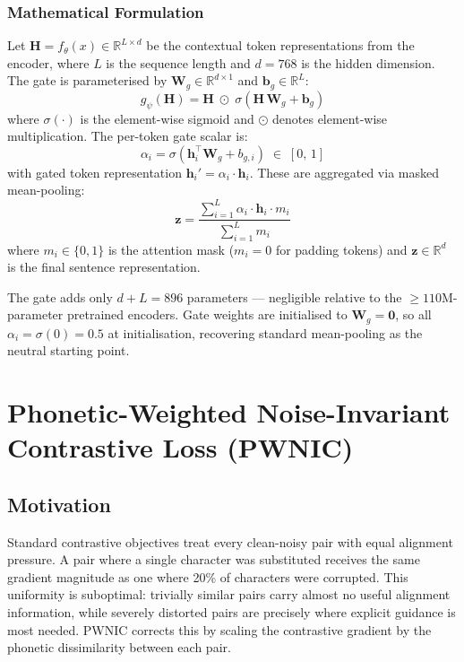 \documentclass[12pt,a4paper]{report}
\newcommand{\R}{\mathbb{R}}
\begin{document}
\subsubsection{Mathematical Formulation}
Let $\mathbf{H} = f_\theta(x) \in \R^{L \times d}$ be the contextual token representations from the encoder, where $L$ is the sequence length and $d = 768$ is the hidden dimension. The gate is parameterised by $\mathbf{W}_g \in \R^{d \times 1}$ and $\mathbf{b}_g \in \R^{L}$:
\begin{equation}
  g_\psi(\mathbf{H}) = \mathbf{H} \;\odot\; \sigma\!\left(\mathbf{H}\,\mathbf{W}_g + \mathbf{b}_g\right)
  \label{eq:gate}
\end{equation}
where $\sigma(\cdot)$ is the element-wise sigmoid and $\odot$ denotes element-wise multiplication. The per-token gate scalar is:
\begin{equation}
  \alpha_i = \sigma\!\left(\mathbf{h}_i^\top \mathbf{W}_g + b_{g,i}\right) \;\in\; [0,\,1]
  \label{eq:gate_scalar}
\end{equation}
with gated token representation $\mathbf{h}_i' = \alpha_i \cdot \mathbf{h}_i$. These are aggregated via masked mean-pooling:
\begin{equation}
  \mathbf{z} = \frac{\displaystyle\sum_{i=1}^{L} \alpha_i \cdot \mathbf{h}_i \cdot m_i}{\displaystyle\sum_{i=1}^{L} m_i}
  \label{eq:gated_pool}
\end{equation}
where $m_i \in \{0,1\}$ is the attention mask ($m_i = 0$ for padding tokens) and $\mathbf{z} \in \R^d$ is the final sentence representation.

The gate adds only $d + L = 896$ parameters --- negligible relative to the $\geq\!110$M-parameter pretrained encoders. Gate weights are initialised to $\mathbf{W}_g = \mathbf{0}$, so all $\alpha_i = \sigma(0) = 0.5$ at initialisation, recovering standard mean-pooling as the neutral starting point.

\section{Phonetic-Weighted Noise-Invariant Contrastive Loss (PWNIC)}
\label{sec:pwnic}

\subsection{Motivation}
Standard contrastive objectives treat every clean-noisy pair with equal alignment pressure. A pair where a single character was substituted receives the same gradient magnitude as one where 20\% of characters were corrupted. This uniformity is suboptimal: trivially similar pairs carry almost no useful alignment information, while severely distorted pairs are precisely where explicit guidance is most needed. PWNIC corrects this by scaling the contrastive gradient by the phonetic dissimilarity between each pair.
\end{document}
